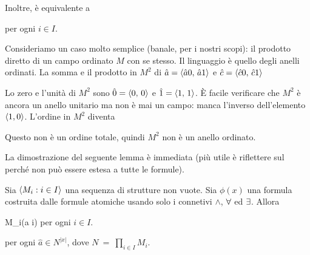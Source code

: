 Inoltre,  \`e equivalente a 

  per ogni $i\in I$.


\begin{example}
Consideriamo un caso molto semplice (banale, per i nostri scopi): il prodotto diretto di un campo ordinato $M$ con se stesso. Il linguaggio \`e quello degli anelli ordinati. La somma e il prodotto in $M^2$ di $\hat a=\langle\hat a0,\,\hat a1\rangle$ e $\hat c=\langle\hat c0,\,\hat c1\rangle$




Lo zero e l'unit\`a di $M^2$ sono $\hat 0=\langle0,\,0\rangle$ e  $\hat 1=\langle1,\,1\rangle$. \`E facile verificare che $M^2$ \`e ancora un anello unitario ma non \`e mai un campo: manca l'inverso dell'elemento $\langle1,0\rangle$. L'ordine in $M^2$ diventa


Questo non \`e un ordine totale, quindi $M^2$ non \`e un anello ordinato.\QED
\end{example}

La dimostrazione del seguente lemma \`e immediata (pi\`u utile \`e riflettere sul perch\'e non pu\`o essere estesa a tutte le formule).

\begin{proposition}\label{proposizioneprodottidiretti}
Sia $\langle M_i : i\in I\rangle$ una sequenza di strutture non vuote. Sia $\phi(x)$ una formula costruita dalle formule atomiche usando solo i connetivi $\wedge$, $\forall$ ed $\exists$. Allora 

{\IFF}
{M_i\models\phi(\hat a i)} per ogni $i\in I$.

per ogni $\hat a\in N^{|x|}$, dove $N\ =\ \displaystyle\prod_{i\in I}M_i$.
\end{proposition}

